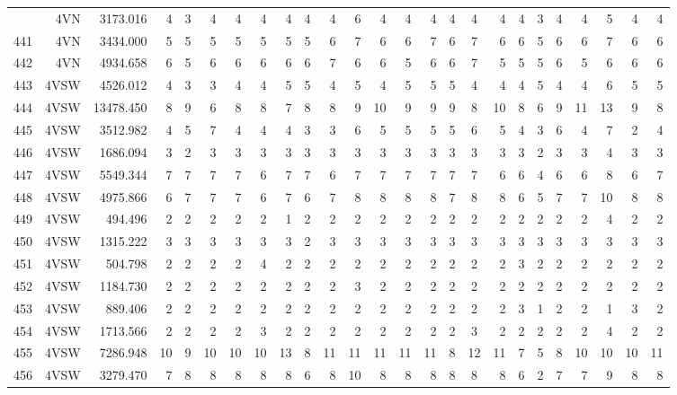 \documentclass[12pt]{article}\usepackage[]{graphicx}\usepackage[]{color}
\begin{document}
\begin{landscape}
\begin{longtable}[t]{crrrrrrrrrrrrrrrcrrrrrrrr}
\endfoot
\bottomrule
\endlastfoot
440 & 4VN & 3173.016 & 4 & 3 & 4 & 4 & 4 & 4 & 4 & 4 & 6 & 4 & 4 & 4 & 4 & 4 & 4 & 4 & 3 & 4 & 4 & 5 & 4 & 4\\
441 & 4VN & 3434.000 & 5 & 5 & 5 & 5 & 5 & 5 & 5 & 6 & 7 & 6 & 6 & 7 & 6 & 7 & 6 & 6 & 5 & 6 & 6 & 7 & 6 & 6\\
442 & 4VN & 4934.658 & 6 & 5 & 6 & 6 & 6 & 6 & 6 & 7 & 6 & 6 & 5 & 6 & 6 & 7 & 5 & 5 & 5 & 6 & 5 & 6 & 6 & 6\\
443 & 4VSW & 4526.012 & 4 & 3 & 3 & 4 & 4 & 5 & 5 & 4 & 5 & 4 & 5 & 5 & 5 & 4 & 4 & 4 & 5 & 4 & 4 & 6 & 5 & 5\\
444 & 4VSW & 13478.450 & 8 & 9 & 6 & 8 & 8 & 7 & 8 & 8 & 9 & 10 & 9 & 9 & 9 & 8 & 10 & 8 & 6 & 9 & 11 & 13 & 9 & 8\\
445 & 4VSW & 3512.982 & 4 & 5 & 7 & 4 & 4 & 4 & 3 & 3 & 6 & 5 & 5 & 5 & 5 & 6 & 5 & 4 & 3 & 6 & 4 & 7 & 2 & 4\\
446 & 4VSW & 1686.094 & 3 & 2 & 3 & 3 & 3 & 3 & 3 & 3 & 3 & 3 & 3 & 3 & 3 & 3 & 3 & 3 & 2 & 3 & 3 & 4 & 3 & 3\\
447 & 4VSW & 5549.344 & 7 & 7 & 7 & 7 & 6 & 7 & 7 & 6 & 7 & 7 & 7 & 7 & 7 & 7 & 6 & 6 & 4 & 6 & 6 & 8 & 6 & 7\\
448 & 4VSW & 4975.866 & 6 & 7 & 7 & 7 & 6 & 7 & 6 & 7 & 8 & 8 & 8 & 8 & 7 & 8 & 8 & 6 & 5 & 7 & 7 & 10 & 8 & 8\\
449 & 4VSW & 494.496 & 2 & 2 & 2 & 2 & 2 & 1 & 2 & 2 & 2 & 2 & 2 & 2 & 2 & 2 & 2 & 2 & 2 & 2 & 2 & 4 & 2 & 2\\
450 & 4VSW & 1315.222 & 3 & 3 & 3 & 3 & 3 & 3 & 2 & 3 & 3 & 3 & 3 & 3 & 3 & 3 & 3 & 3 & 3 & 3 & 3 & 3 & 3 & 3\\
451 & 4VSW & 504.798 & 2 & 2 & 2 & 2 & 4 & 2 & 2 & 2 & 2 & 2 & 2 & 2 & 2 & 2 & 2 & 3 & 2 & 2 & 2 & 2 & 2 & 2\\
452 & 4VSW & 1184.730 & 2 & 2 & 2 & 2 & 2 & 2 & 2 & 2 & 3 & 2 & 2 & 2 & 2 & 2 & 2 & 2 & 2 & 2 & 2 & 2 & 2 & 2\\
453 & 4VSW & 889.406 & 2 & 2 & 2 & 2 & 2 & 2 & 2 & 2 & 2 & 2 & 2 & 2 & 2 & 2 & 2 & 3 & 1 & 2 & 2 & 1 & 3 & 2\\
454 & 4VSW & 1713.566 & 2 & 2 & 2 & 2 & 3 & 2 & 2 & 2 & 2 & 2 & 2 & 2 & 2 & 3 & 2 & 2 & 2 & 2 & 2 & 4 & 2 & 2\\
455 & 4VSW & 7286.948 & 10 & 9 & 10 & 10 & 10 & 13 & 8 & 11 & 11 & 11 & 11 & 11 & 8 & 12 & 11 & 7 & 5 & 8 & 10 & 10 & 10 & 11\\
456 & 4VSW & 3279.470 & 7 & 8 & 8 & 8 & 8 & 8 & 6 & 8 & 10 & 8 & 8 & 8 & 8 & 8 & 8 & 6 & 2 & 7 & 7 & 9 & 8 & 8\\

\end{longtable}
\end{landscape}
\end{document}
